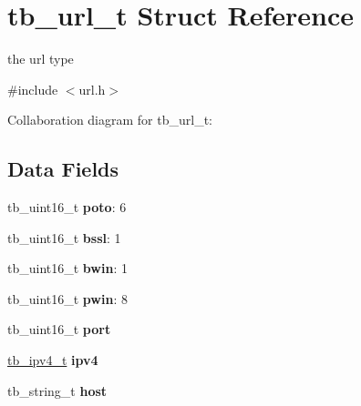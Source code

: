 \hypertarget{structtb__url__t}{\section{tb\-\_\-url\-\_\-t Struct Reference}
\label{structtb__url__t}
}


the url type  




{\ttfamily \#include $<$url.\-h$>$}



Collaboration diagram for tb\-\_\-url\-\_\-t\-:
\subsection*{Data Fields}
\begin{DoxyCompactItemize}
\item 
\hypertarget{structtb__url__t_a2a6fe79ccea23c112fb52910c4cfcf31}{tb\-\_\-uint16\-\_\-t {\bfseries poto}\-: 6}\label{structtb__url__t_a2a6fe79ccea23c112fb52910c4cfcf31}

\item 
\hypertarget{structtb__url__t_a050c47af6d14bf033c05c5f9be0a0c45}{tb\-\_\-uint16\-\_\-t {\bfseries bssl}\-: 1}\label{structtb__url__t_a050c47af6d14bf033c05c5f9be0a0c45}

\item 
\hypertarget{structtb__url__t_a4a2795da68591cdf7c19136e0499b844}{tb\-\_\-uint16\-\_\-t {\bfseries bwin}\-: 1}\label{structtb__url__t_a4a2795da68591cdf7c19136e0499b844}

\item 
\hypertarget{structtb__url__t_a7b566554b93f70686436c93290499568}{tb\-\_\-uint16\-\_\-t {\bfseries pwin}\-: 8}\label{structtb__url__t_a7b566554b93f70686436c93290499568}

\item 
\hypertarget{structtb__url__t_a1230656fde46e9800afa7221fcca7b2e}{tb\-\_\-uint16\-\_\-t {\bfseries port}}\label{structtb__url__t_a1230656fde46e9800afa7221fcca7b2e}

\item 
\hypertarget{structtb__url__t_a09034f6b3100b1e5d06a34fa6e92c4f8}{\hyperlink{uniontb__ipv4__t}{tb\-\_\-ipv4\-\_\-t} {\bfseries ipv4}}\label{structtb__url__t_a09034f6b3100b1e5d06a34fa6e92c4f8}

\item 
\hypertarget{structtb__url__t_a74c239176b3d1b09a2f975c1dfe39aab}{tb\-\_\-string\-\_\-t {\bfseries host}}\label{structtb__url__t_a74c239176b3d1b09a2f975c1dfe39aab}


\end{DoxyCompactItemize}
